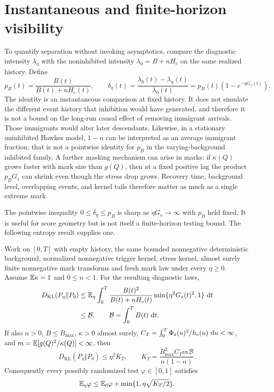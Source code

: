 \section{Instantaneous and finite-horizon visibility}

To quantify separation without invoking asymptotics, compare the diagnostic intensity \(\lambda_\eta\) with the noninhibited intensity \(\lambda_0=B+nH_e\) on the same realized history. Define
\[
p_B(t)=\frac{B(t)}{B(t)+nH_e(t)},
\qquad
\delta_\eta(t)=\frac{\lambda_0(t)-\lambda_\eta(t)}{\lambda_0(t)}
=p_B(t)\left(1-e^{-\eta G_s(t)}\right).
\]
The identity is an instantaneous comparison at fixed history. It does not simulate the different event history that inhibition would have generated, and therefore it is not a bound on the long-run causal effect of removing immigrant arrivals. Those immigrants would alter later descendants. Likewise, in a stationary uninhibited Hawkes model, \(1-n\) can be interpreted as an average immigrant fraction; that is not a pointwise identity for \(p_B\) in the varying-background inhibited family. A further masking mechanism can arise in marks: if \(\kappa(Q)\) grows faster with mark size than \(g(Q)\), then at a fixed positive lag the product \(p_BG_s\) can shrink even though the stress drop grows. Recovery time, background level, overlapping events, and kernel tails therefore matter as much as a single extreme mark.

The pointwise inequality \(0\le\delta_\eta\le p_B\) is sharp as \(\eta G_s\to\infty\) with \(p_B\) held fixed. It is useful for score geometry but is not itself a finite-horizon testing bound. The following entropy result supplies one.

\begin{proposition}
\label{prop:visibility}
Work on \([0,T]\) with empty history, the same bounded nonnegative deterministic background, normalized nonnegative trigger kernel, stress kernel, almost surely finite nonnegative mark transforms and fresh mark law under every \(\eta\ge0\). Assume \(\mathbb{E} \kappa=1\) and \(0\le n<1\). For the resulting diagnostic laws,
\begin{align}
D_{\mathrm{KL}}(P_\eta\Vert P_0)
&\le \mathbb{E} _\eta\int_0^T
\frac{B(t)^2}{B(t)+nH_e(t)}
\min\{\eta^2G_s(t)^2,1\}\,\mathop{}\!\mathrm{d} t \\
&\le \mathcal B,\qquad \mathcal B=\int_0^T B(t)\,\mathop{}\!\mathrm{d} t.
\end{align}
If also \(n>0\), \(B\le B_{\max}\), \(\kappa>0\) almost surely,
\(C_T=\int_0^T\Phi_s(u)^2/h_e(u)\,\mathop{}\!\mathrm{d} u<\infty\), and
\(m=\mathbb{E} [g(Q)^2/\kappa(Q)]<\infty\), then
\[
D_{\mathrm{KL}}(P_\eta\Vert P_0)\le\eta^2K_T,
\qquad K_T=\frac{B_{\max}^2C_Tm\mathcal B}{n(1-n)}.
\]
Consequently every possibly randomized test \(\varphi\in[0,1]\) satisfies
\[
\mathbb{E} _\eta\varphi\le\mathbb{E} _0\varphi+
\min\{1,\eta\sqrt{K_T/2}\}.
\]
\end{proposition}

